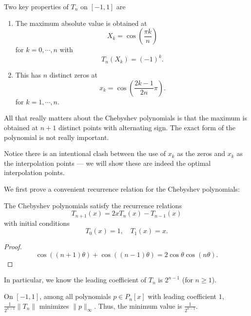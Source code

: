 \documentclass[a4paper]{article}
\begin{document}
Two key properties of $T_n$ on $[-1, 1]$ are
\begin{enumerate}
  \item The maximum absolute value is obtained at
    \[
      X_k = \cos\left(\frac{\pi k}{n}\right)
    \]
    for $k = 0, \cdots, n$ with
    \[
      T_n(X_k) = (-1)^k.
    \]
  \item This has $n$ distinct zeros at
    \[
      x_k = \cos\left(\frac{2k - 1}{2n}\pi\right).
    \]
    for $k = 1, \cdots, n$.
\end{enumerate}
\begin{center}
\end{center}
All that really matters about the Chebyshev polynomials is that the maximum is obtained at $n + 1$ distinct points with alternating sign. The exact form of the polynomial is not really important.

Notice there is an intentional clash between the use of $x_k$ as the zeros and $x_k$ as the interpolation points --- we will show these are indeed the optimal interpolation points.

We first prove a convenient recurrence relation for the Chebyshev polynomials:
\begin{lemma}
  The Chebyshev polynomials satisfy the recurrence relations
  \[
    T_{n + 1}(x) = 2x T_n(x) - T_{n - 1}(x)
  \]
  with initial conditions
  \[
    T_0(x) = 1,\quad T_1(x) = x.
  \]
\end{lemma}

\begin{proof}
  \[
    \cos((n + 1) \theta) + \cos((n - 1)\theta) = 2\cos \theta \cos(n\theta).
  \]
\end{proof}
In particular, we know the leading coefficient of $T_n$ is $2^{n - 1}$ (for $n \geq 1$).

\begin{thm}
  On $[-1, 1]$, among all polynomials $p \in P_n[x]$ with leading coefficient $1$, $\frac{1}{2^{n - 1}} \|T_n\|$ minimizes $\|p\|_{\infty}$. Thus, the minimum value is $\frac{1}{2^{n - 1}}$.
\end{thm}
\end{document}
